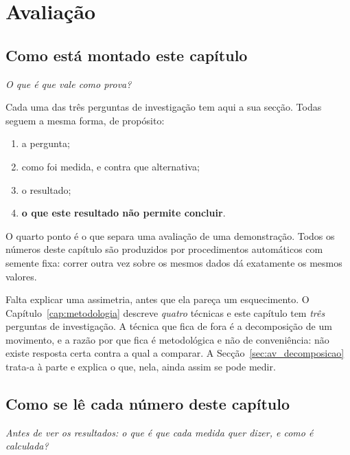 
\chapter{Avaliação}
\label{cap:avaliacao}

\section{Como está montado este capítulo}
\label{sec:av_montagem}

\emph{O que é que vale como prova?}

Cada uma das três perguntas de investigação tem aqui a sua secção. Todas seguem a mesma forma, de
propósito:

\begin{enumerate}
  \item a pergunta;
  \item como foi medida, e contra que alternativa;
  \item o resultado;
  \item \textbf{o que este resultado não permite concluir}.
\end{enumerate}

O quarto ponto é o que separa uma avaliação de uma demonstração. Todos os números deste capítulo são
produzidos por procedimentos automáticos com semente fixa: correr outra vez sobre os mesmos dados dá
exatamente os mesmos valores.

Falta explicar uma assimetria, antes que ela pareça um esquecimento. O
Capítulo~\ref{cap:metodologia} descreve \emph{quatro} técnicas e este capítulo tem \emph{três}
perguntas de investigação. A técnica que fica de fora é a decomposição de um movimento, e a razão
por que fica é metodológica e não de conveniência: não existe resposta certa contra a qual a
comparar. A Secção~\ref{sec:av_decomposicao} trata-a à parte e explica o que, nela, ainda assim se
pode medir.

\section{Como se lê cada número deste capítulo}
\label{sec:av_metricas}

\emph{Antes de ver os resultados: o que é que cada medida quer dizer, e como é calculada?}

